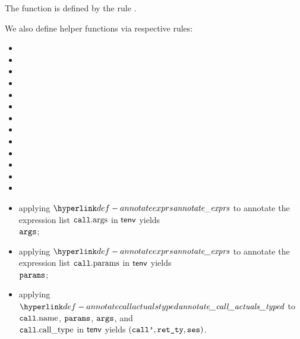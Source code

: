 The function is defined by the rule .

We also define helper functions via respective rules:
\begin{itemize}
  \item {}
  \item {}
  \item {}
  \item {}
  \item {}
  \item {}
  \item {}
  \item {}
  \item {}
  \item {}
  \item {}
  \item {}
  \item {}
\end{itemize}

\ProseParagraph
\AllApply
\begin{itemize}
  \item applying $\annotateexprlist$ to annotate the expression list $\texttt{call}.\text{args}$ in $\textsf{tenv}$ yields \\
        $\texttt{args}$\ProseOrTypeError;
  \item applying $\annotateexprlist$ to annotate the expression list $\texttt{call}.\text{params}$ in $\textsf{tenv}$ yields \\
        $\texttt{params}$\ProseOrTypeError;
  \item applying $\annotatecallactualstyped$ to $\texttt{call}.\text{name}$, $\texttt{params}$, $\texttt{args}$, and \\
        $\texttt{call}.\text{call\_type}$ in $\textsf{tenv}$ yields $(\texttt{call'}, \texttt{ret\_ty}, \texttt{ses})$\ProseOrTypeError.
\end{itemize}


